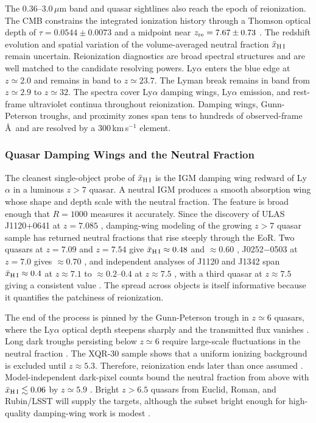 The $0.36$--$3.0\,\mu$m band and quasar sightlines also reach the epoch of reionization. The CMB constrains the integrated ionization history through a Thomson optical depth of $\tau=0.0544\pm0.0073$ and a midpoint near $z_{\rm re}=7.67\pm0.73$ \cite{planck2018}. The redshift evolution and spatial variation of the volume-averaged neutral fraction $\bar{x}_{\rm H\,I}$ remain uncertain. Reionization diagnostics are broad spectral structures and are well matched to the candidate resolving powers. Ly$\alpha$ enters the blue edge at $z\simeq2.0$ and remains in band to $z\simeq23.7$. The Lyman break remains in band from $z\simeq2.9$ to $z\simeq32$. The spectra cover Ly$\alpha$ damping wings, Ly$\alpha$ emission, and rest-frame ultraviolet continua throughout reionization. Damping wings, Gunn-Peterson troughs, and proximity zones span tens to hundreds of observed-frame \AA\ and are resolved by a $300$\,km\,s$^{-1}$ element.

\subsubsection{Quasar Damping Wings and the Neutral Fraction}

The cleanest single-object probe of $\bar{x}_{\rm H\,I}$ is the IGM damping wing redward of Ly$\alpha$ in a luminous $z>7$ quasar. A neutral IGM produces a smooth absorption wing whose shape and depth scale with the neutral fraction. The feature is broad enough that $R=1000$ measures it accurately. Since the discovery of ULAS\,J1120+0641 at $z=7.085$ \cite{mortlock2011}, damping-wing modeling of the growing $z>7$ quasar sample has returned neutral fractions that rise steeply through the EoR. Two quasars at $z=7.09$ and $z=7.54$ give $\bar{x}_{\rm H\,I}\approx0.48$ and $\approx0.60$ \cite{davies2018}, J0252$-$0503 at $z=7.0$ gives $\approx0.70$ \cite{wang2020}, and independent analyses of J1120 and J1342 span $\bar{x}_{\rm H\,I}\approx0.4$ at $z\approx7.1$ to $\approx0.2$--$0.4$ at $z\approx7.5$ \cite{greig2017,greig2019}, with a third quasar at $z\approx7.5$ giving a consistent value \cite{yang2020}. The spread across objects is itself informative because it quantifies the patchiness of reionization.

The end of the process is pinned by the Gunn-Peterson trough in $z\simeq6$ quasars, where the Ly$\alpha$ optical depth steepens sharply and the transmitted flux vanishes \cite{fan2006}. Long dark troughs persisting below $z\simeq6$ require large-scale fluctuations in the neutral fraction \cite{becker2015}. The XQR-30 sample shows that a uniform ionizing background is excluded until $z\approx5.3$. Therefore, reionization ends later than once assumed \cite{bosman2022}. Model-independent dark-pixel counts bound the neutral fraction from above with $\bar{x}_{\rm H\,I}\lesssim0.06$ by $z\simeq5.9$ \cite{mcgreer2015}. Bright $z>6.5$ quasars from Euclid, Roman, and Rubin/LSST will supply the targets, although the subset bright enough for high-quality damping-wing work is modest \cite{mortlock2024}.

